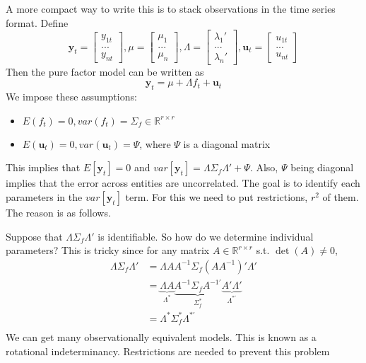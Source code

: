 A more compact way to write this is to stack observations in the time series format. Define
\[
\mathbf{y}_t = \begin{bmatrix}y_{1t}\\...\\y_{nt}\end{bmatrix}, \mu= \begin{bmatrix}\mu_{1}\\...\\ \mu_{n}\end{bmatrix}, \Lambda =  \begin{bmatrix}\lambda_{1}'\\...\\ \lambda_{n}'\end{bmatrix}, \mathbf{u}_t = \begin{bmatrix}u_{1t}\\...\\u_{nt}\end{bmatrix}
\]
Then the pure factor model can be written as
\[
\mathbf{y}_t = \mu+\Lambda f_t+\mathbf{u}_t 
\]
We impose these assumptions:
\begin{itemize}
\item $E(f_t)=0, var(f_t)=\Sigma_f\in\mathbb{R}^{r\times r}$
\item $E(\mathbf{u}_t)=0, var(\mathbf{u}_t)=\Psi$, where $\Psi$ is a diagonal matrix
\end{itemize}
This implies that $E[\mathbf{y}_t]=0$ and $var[\mathbf{y}_t]=\Lambda \Sigma_f \Lambda'+\Psi$. Also, $\Psi$ being diagonal implies that the error across entities are uncorrelated. The goal is to identify each parameters in the $var[\mathbf{y}_t]$ term. For this we need to put restrictions, $r^2$ of them. The reason is as follows. \par
Suppose that $\Lambda\Sigma_f\Lambda'$ is identifiable. So how do we determine individual parameters? This is tricky since for any matrix $A\in\mathbb{R}^{r\times r}$ s.t. $\det(A)\neq0$, 
\begin{align*}
\Lambda \Sigma_f \Lambda'&=\Lambda AA^{-1}\Sigma_f( AA^{-1})' \Lambda'\\
&=\underbrace{\Lambda A}_{\Lambda^*}\underbrace{A^{-1}\Sigma_fA^{-1'}}_{\Sigma_f^*}\underbrace{A' \Lambda'}_{\Lambda^{*'}}\\
&=\Lambda^* \Sigma_f^* \Lambda^{*'}\\
\end{align*}
We can get many observationally equivalent models. This is known as a rotational indeterminancy. Restrictions are needed to prevent this problem
